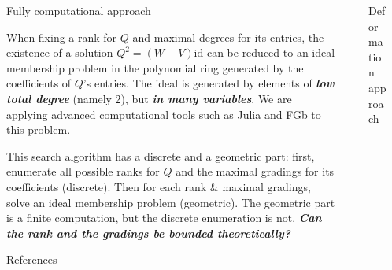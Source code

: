 \documentclass[final]{beamer}
\newlength{\sepwid}
\newlength{\onecolwid}
\begin{document}
\begin{frame}[t]
\begin{columns}[t] %

\begin{column}{\sepwid}\end{column} %

\begin{column}{\onecolwid} %

\begin{block}{Fully computational approach}

When fixing a rank for $Q$ and maximal degrees for its entries, the existence
of a solution $Q^{2}=(W-V)\mathrm{id}$ can be reduced to an ideal membership problem
in the polynomial ring generated by the coefficients of $Q$'s entries.
The ideal is generated by elements of \textbf{\emph{low total degree}}
(namely 2), but \textbf{\emph{in many variables}}. We are applying
advanced computational tools such as Julia \cite{bezanson2017julia} and FGb \cite{FGb}
to this problem.

This search algorithm has a discrete
and a geometric part: first, enumerate all possible ranks for $Q$
and the maximal gradings for its coefficients (discrete). Then for
each rank \& maximal gradings, solve an ideal membership problem (geometric).
The geometric part is a finite computation, but the discrete enumeration
is not. \textbf{\emph{Can the rank and the gradings be bounded theoretically?}}
\end{block}

\vspace{60mm}

\begin{block}{References}

\nocite{*} %
\small{
\vspace{0.75in}}

\end{block}

\end{column} %

\begin{column}{\sepwid}\end{column} %

\begin{column}{\onecolwid} %

\begin{block}{Deformation approach}


\end{block}
\end{column}
\end{columns}
\end{frame}
\end{document}
